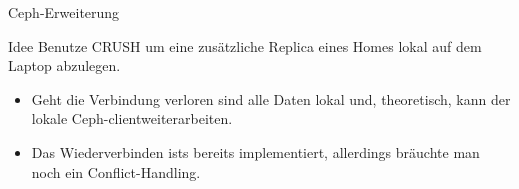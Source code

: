 \documentclass[hyperref={xetex}]{beamer}
\begin{document}
\begin{frame}{Ceph-Erweiterung}
    \begin{block}{Idee}
Benutze CRUSH um eine zusätzliche Replica eines Homes lokal auf dem Laptop abzulegen.        
    \end{block}
    \begin{itemize}
        \item Geht die Verbindung verloren sind alle Daten lokal und, theoretisch, kann der lokale Ceph-clientweiterarbeiten.
        \item Das Wiederverbinden ists bereits implementiert, allerdings bräuchte man noch ein Conflict-Handling.
    \end{itemize}





\end{frame}
\end{document}
